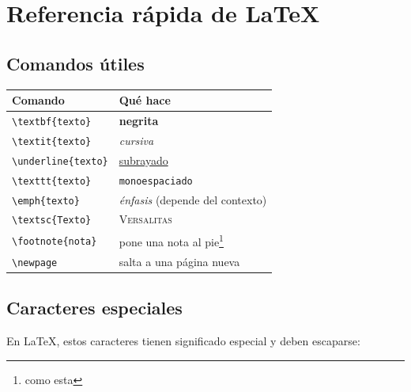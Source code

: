 \section{Referencia rápida de LaTeX}

\subsection{Comandos útiles}

\begin{center}
\begin{tabular}{ll}
\toprule
\textbf{Comando} & \textbf{Qué hace} \\
\midrule
\texttt{\textbackslash{}textbf\{texto\}} & \textbf{negrita} \\
\texttt{\textbackslash{}textit\{texto\}} & \textit{cursiva} \\
\texttt{\textbackslash{}underline\{texto\}} & \underline{subrayado} \\
\texttt{\textbackslash{}texttt\{texto\}} & \texttt{monoespaciado} \\
\texttt{\textbackslash{}emph\{texto\}} & \emph{énfasis} (depende del contexto) \\
\texttt{\textbackslash{}textsc\{Texto\}} & \textsc{Versalitas} \\
\texttt{\textbackslash{}footnote\{nota\}} & pone una nota al pie\footnote{como esta} \\
\texttt{\textbackslash{}newpage} & salta a una página nueva \\
\bottomrule
\end{tabular}
\end{center}

\subsection{Caracteres especiales}

En LaTeX, estos caracteres tienen significado especial y deben escaparse:

